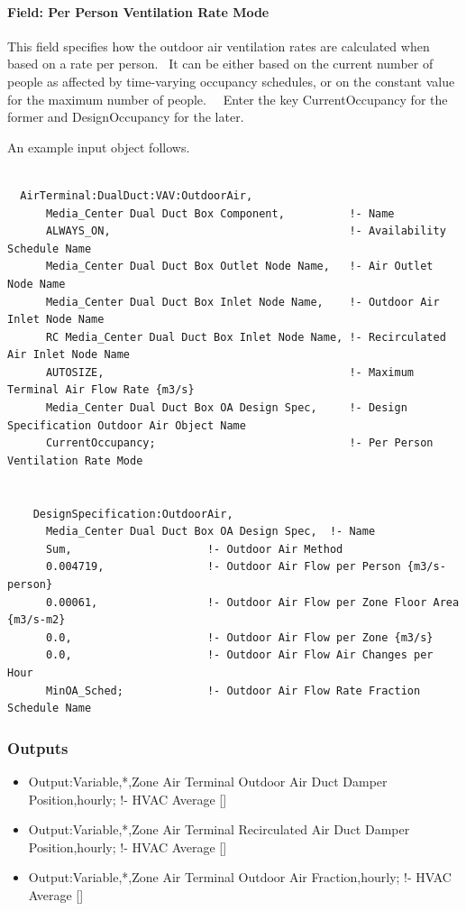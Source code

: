 \paragraph{Field: Per Person Ventilation Rate Mode}

This field specifies how the outdoor air ventilation rates are calculated when based on a rate per person.~ It can be either based on the current number of people as affected by time-varying occupancy schedules, or on the constant value for the maximum number of people.~~ Enter the key CurrentOccupancy for the former and DesignOccupancy for the later.

An example input object follows.

\begin{lstlisting}

  AirTerminal:DualDuct:VAV:OutdoorAir,
      Media_Center Dual Duct Box Component,          !- Name
      ALWAYS_ON,                                     !- Availability Schedule Name
      Media_Center Dual Duct Box Outlet Node Name,   !- Air Outlet Node Name
      Media_Center Dual Duct Box Inlet Node Name,    !- Outdoor Air Inlet Node Name
      RC Media_Center Dual Duct Box Inlet Node Name, !- Recirculated Air Inlet Node Name
      AUTOSIZE,                                      !- Maximum Terminal Air Flow Rate {m3/s}
      Media_Center Dual Duct Box OA Design Spec,     !- Design Specification Outdoor Air Object Name
      CurrentOccupancy;                              !- Per Person Ventilation Rate Mode


    DesignSpecification:OutdoorAir,
      Media_Center Dual Duct Box OA Design Spec,  !- Name
      Sum,                     !- Outdoor Air Method
      0.004719,                !- Outdoor Air Flow per Person {m3/s-person}
      0.00061,                 !- Outdoor Air Flow per Zone Floor Area {m3/s-m2}
      0.0,                     !- Outdoor Air Flow per Zone {m3/s}
      0.0,                     !- Outdoor Air Flow Air Changes per Hour
      MinOA_Sched;             !- Outdoor Air Flow Rate Fraction Schedule Name
\end{lstlisting}

\subsubsection{Outputs}\label{outputs-14}

\begin{itemize}
\item
  Output:Variable,*,Zone Air Terminal Outdoor Air Duct Damper Position,hourly; !- HVAC Average {[]}
\item
  Output:Variable,*,Zone Air Terminal Recirculated Air Duct Damper Position,hourly; !- HVAC Average {[]}
\item
  Output:Variable,*,Zone Air Terminal Outdoor Air Fraction,hourly; !- HVAC Average {[]}
\end{itemize}

